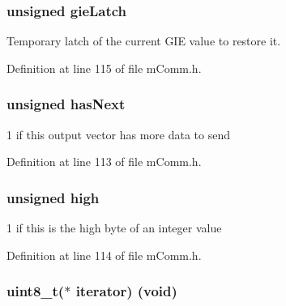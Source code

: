 \subsubsection[{gie\+Latch}]{\setlength{\rightskip}{0pt plus 5cm}unsigned gie\+Latch}\label{structm_comm___output_vector_ad64db6943e903d2e5a131c1df1799aef}


Temporary latch of the current G\+I\+E value to restore it. 



Definition at line 115 of file m\+Comm.\+h.

\hypertarget{structm_comm___output_vector_aea28f1095fd107951e1db3894ea8d03b}{}
\subsubsection[{has\+Next}]{\setlength{\rightskip}{0pt plus 5cm}unsigned has\+Next}\label{structm_comm___output_vector_aea28f1095fd107951e1db3894ea8d03b}


\textquotesingle{}1\textquotesingle{} if this output vector has more data to send 



Definition at line 113 of file m\+Comm.\+h.

\hypertarget{structm_comm___output_vector_a529850de2db175ea613902cb8ff95ac2}{}
\subsubsection[{high}]{\setlength{\rightskip}{0pt plus 5cm}unsigned high}\label{structm_comm___output_vector_a529850de2db175ea613902cb8ff95ac2}


\textquotesingle{}1\textquotesingle{} if this is the high byte of an integer value 



Definition at line 114 of file m\+Comm.\+h.

\hypertarget{structm_comm___output_vector_a6995b26b309317115ab75caad4adcf1d}{}
\subsubsection[{iterator}]{\setlength{\rightskip}{0pt plus 5cm}uint8\+\_\+t($\ast$ iterator) (void)}\label{structm_comm___output_vector_a6995b26b309317115ab75caad4adcf1d}


